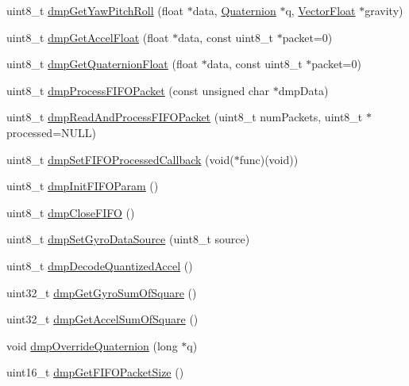 \begin{DoxyCompactItemize}
\item 
uint8\+\_\+t \mbox{\hyperlink{classMPU6050_a4e8c0d64e9ad7266b1a7970bb38d6b27}{dmp\+Get\+Yaw\+Pitch\+Roll}} (float $\ast$data, \mbox{\hyperlink{classQuaternion}{Quaternion}} $\ast$q, \mbox{\hyperlink{classVectorFloat}{Vector\+Float}} $\ast$gravity)
\item 
uint8\+\_\+t \mbox{\hyperlink{classMPU6050_a6045ca343e5b35fc454f4793b3f8eaf9}{dmp\+Get\+Accel\+Float}} (float $\ast$data, const uint8\+\_\+t $\ast$packet=0)
\item 
uint8\+\_\+t \mbox{\hyperlink{classMPU6050_ab9021b9acffd400ac6d1b0d78e1a633c}{dmp\+Get\+Quaternion\+Float}} (float $\ast$data, const uint8\+\_\+t $\ast$packet=0)
\item 
uint8\+\_\+t \mbox{\hyperlink{classMPU6050_a6bfac470414ede55359fc5978de72548}{dmp\+Process\+F\+I\+F\+O\+Packet}} (const unsigned char $\ast$dmp\+Data)
\item 
uint8\+\_\+t \mbox{\hyperlink{classMPU6050_acd224b46caa5821bb1815ae0bd7ae326}{dmp\+Read\+And\+Process\+F\+I\+F\+O\+Packet}} (uint8\+\_\+t num\+Packets, uint8\+\_\+t $\ast$processed=N\+U\+LL)
\item 
uint8\+\_\+t \mbox{\hyperlink{classMPU6050_a3dd7662a5e7ef6bfc017c1b6237960f8}{dmp\+Set\+F\+I\+F\+O\+Processed\+Callback}} (void($\ast$func)(void))
\item 
uint8\+\_\+t \mbox{\hyperlink{classMPU6050_ab6b2641479b580a88dbcc36a225a1ff6}{dmp\+Init\+F\+I\+F\+O\+Param}} ()
\item 
uint8\+\_\+t \mbox{\hyperlink{classMPU6050_a9040079b7f934aa2f84f76004aea7e6f}{dmp\+Close\+F\+I\+FO}} ()
\item 
uint8\+\_\+t \mbox{\hyperlink{classMPU6050_a235b9911e8fc8b3674cc9ffcfa03e107}{dmp\+Set\+Gyro\+Data\+Source}} (uint8\+\_\+t source)
\item 
uint8\+\_\+t \mbox{\hyperlink{classMPU6050_a39ed46d7a593d93fbf147318331dd655}{dmp\+Decode\+Quantized\+Accel}} ()
\item 
uint32\+\_\+t \mbox{\hyperlink{classMPU6050_a0df6f1422e81759cc8fc90afe2c7c19d}{dmp\+Get\+Gyro\+Sum\+Of\+Square}} ()
\item 
uint32\+\_\+t \mbox{\hyperlink{classMPU6050_ab98f49d9a80425fb27a2bc54ba39ae63}{dmp\+Get\+Accel\+Sum\+Of\+Square}} ()
\item 
void \mbox{\hyperlink{classMPU6050_a7d2adbc6952716186382f33e6987acd1}{dmp\+Override\+Quaternion}} (long $\ast$q)
\item 
uint16\+\_\+t \mbox{\hyperlink{classMPU6050_ac91c7e1c0647a6269b890e04d2fabce9}{dmp\+Get\+F\+I\+F\+O\+Packet\+Size}} ()

\end{DoxyCompactItemize}
